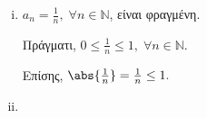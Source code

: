 \documentclass[main.tex]{subfiles}
\begin{document}
\begin{examples}
\item {}  
    \begin{enumerate}[i)]
        \item $ a_{n}= \frac{1}{n}, \; \forall n \in \mathbb{N} $, είναι φραγμένη.
            
            Πράγματι, $ 0 \leq \frac{1}{n} \leq 1, \; \forall n \in \mathbb{N} $. 

            Επίσης, $ \abs{\frac{1}{n}} = \frac{1}{n} \leq 1. $
        \item 
    \end{enumerate}
\end{examples}
\end{document}
